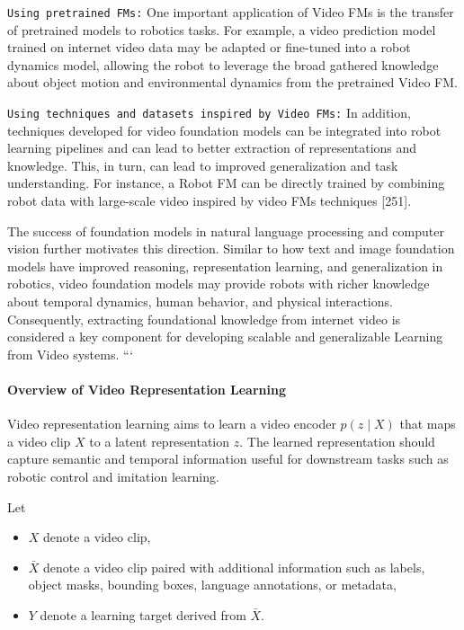 \texttt{Using pretrained FMs:} One important application of Video FMs is the transfer of pretrained models to robotics tasks. For example, a video prediction model trained on internet video data may be adapted or fine-tuned into a robot dynamics model, allowing the robot to leverage the broad gathered knowledge about object motion and environmental dynamics from the pretrained Video FM. 

\texttt{Using techniques and datasets inspired by Video FMs:} In addition, techniques developed for video foundation models can be integrated into robot learning pipelines and can lead to better extraction of representations and knowledge. This, in turn, can lead to improved generalization and task understanding. For instance, a Robot FM can be directly trained by combining robot data with large-scale video inspired by video FMs techniques [251].


The success of foundation models in natural language processing and computer vision further motivates this direction. Similar to how text and image foundation models have improved reasoning, representation learning, and generalization in robotics, video foundation models may provide robots with richer knowledge about temporal dynamics, human behavior, and physical interactions. Consequently, extracting foundational knowledge from internet video is considered a key component for developing scalable and generalizable Learning from Video systems.
```











\paragraph{Overview of Video Representation Learning}

Video representation learning aims to learn a video encoder 
$p(z \mid X)$ that maps a video clip $X$ to a latent representation $z$. 
The learned representation should capture semantic and temporal information 
useful for downstream tasks such as robotic control and imitation learning.

Let
\begin{itemize}
    \item $X$ denote a video clip,
    \item $\bar X$ denote a video clip paired with additional information 
    such as labels, object masks, bounding boxes, language annotations, or metadata,
    \item $Y$ denote a learning target derived from $\bar X$.
\end{itemize}

